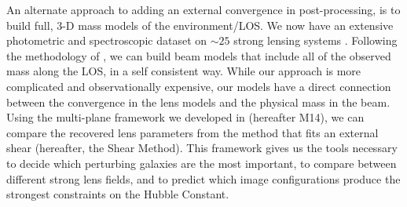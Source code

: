 An alternate approach to adding an external convergence in post-processing, is to build full, 3-D mass models of the environment/LOS.  We now have an extensive photometric and spectroscopic dataset on $\sim25$ strong lensing systems \citep{Momcheva06,Williams08, Wong11, Momcheva15}. Following the methodology of \citet{Wong11}, we can build beam models that include all of the observed mass along the LOS, in a self consistent way.  While our approach is more complicated and observationally expensive, our models have a direct connection between the convergence in the lens models and the physical mass in the beam. Using the multi-plane framework we developed in \citet{McCully14} (hereafter M14), we can compare the recovered lens parameters from the method that fits an external shear (hereafter, the Shear Method). This framework gives us the tools necessary to decide which perturbing galaxies are the most important, to compare between different strong lens fields, and to predict which image configurations produce the strongest constraints on the Hubble Constant.